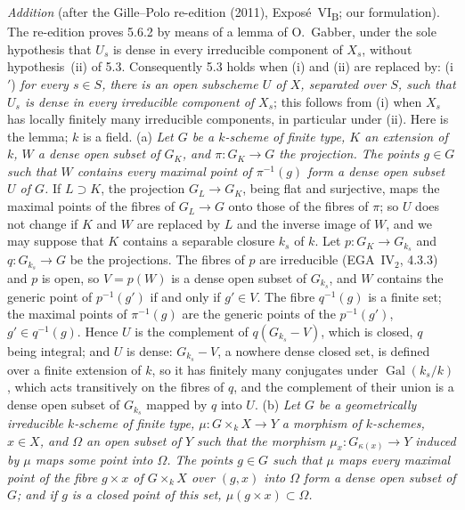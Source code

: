 \par\medskip\noindent
\emph{Addition} (after the Gille--Polo re-edition (2011), Expos\'e~VI\textsubscript{B}; our formulation).
The re-edition proves 5.6.2 by means of a lemma of O.~Gabber, under the sole hypothesis that \(U_s\) is dense in
every irreducible component of \(X_s\), without hypothesis~(ii) of 5.3. Consequently 5.3 holds when (i) and (ii)
are replaced by: (i\('\)) \emph{for every \(s\in S\), there is an open subscheme \(U\) of \(X\), separated over
\(S\), such that \(U_s\) is dense in every irreducible component of \(X_s\)}; this follows from (i) when \(X_s\)
has locally finitely many irreducible components, in particular under (ii). Here is the lemma; \(k\) is a field.
(a) \emph{Let \(G\) be a \(k\)-scheme of finite type, \(K\) an extension of \(k\), \(W\) a dense open subset of
\(G_K\), and \(\pi\colon G_K\to G\) the projection. The points \(g\in G\) such that \(W\) contains every maximal
point of \(\pi^{-1}(g)\) form a dense open subset \(U\) of \(G\).} If \(L\supset K\), the projection
\(G_L\to G_K\), being flat and surjective, maps the maximal points of the fibres of \(G_L\to G\) onto those of
the fibres of \(\pi\); so \(U\) does not change if \(K\) and \(W\) are replaced by \(L\) and the inverse image of
\(W\), and we may suppose that \(K\) contains a separable closure \(k_s\) of \(k\). Let \(p\colon G_K\to G_{k_s}\)
and \(q\colon G_{k_s}\to G\) be the projections. The fibres of \(p\) are irreducible (EGA~IV\(_2\), 4.3.3) and
\(p\) is open, so \(V=p(W)\) is a dense open subset of \(G_{k_s}\), and \(W\) contains the generic point of
\(p^{-1}(g')\) if and only if \(g'\in V\). The fibre \(q^{-1}(g)\) is a finite set; the maximal points of
\(\pi^{-1}(g)\) are the generic points of the \(p^{-1}(g')\), \(g'\in q^{-1}(g)\). Hence \(U\) is the complement
of \(q(G_{k_s}-V)\), which is closed, \(q\) being integral; and \(U\) is dense: \(G_{k_s}-V\), a nowhere dense
closed set, is defined over a finite extension of \(k\), so it has finitely many conjugates under
\(\operatorname{Gal}(k_s/k)\), which acts transitively on the fibres of \(q\), and the complement of their union is
a dense open subset of \(G_{k_s}\) mapped by \(q\) into \(U\).
(b) \emph{Let \(G\) be a geometrically irreducible \(k\)-scheme of finite type, \(\mu\colon G\times_kX\to Y\) a
morphism of \(k\)-schemes, \(x\in X\), and \(\Omega\) an open subset of \(Y\) such that the morphism
\(\mu_x\colon G_{\kappa(x)}\to Y\) induced by \(\mu\) maps some point into \(\Omega\). The points \(g\in G\) such
that \(\mu\) maps every maximal point of the fibre \(g\times x\) of \(G\times_kX\) over \((g,x)\) into \(\Omega\)
form a dense open subset of \(G\); and if \(g\) is a closed point of this set, \(\mu(g\times x)\subset\Omega\).}
